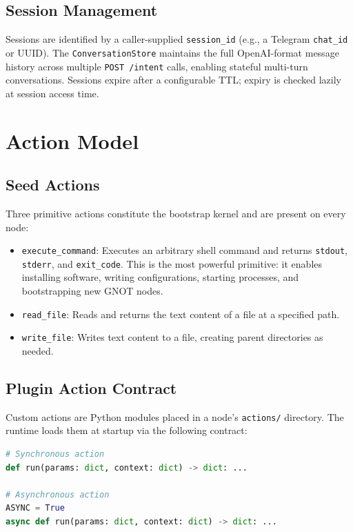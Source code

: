 \documentclass[10pt,twocolumn]{article}
\begin{document}
\subsection{Session Management}

Sessions are identified by a caller-supplied \texttt{session\_id}
(e.g., a Telegram \texttt{chat\_id} or UUID). The
\texttt{ConversationStore} maintains the full OpenAI-format message
history across multiple \texttt{POST /intent} calls, enabling stateful
multi-turn conversations. Sessions expire after a configurable TTL;
expiry is checked lazily at session access time.

\FloatBarrier
\section{Action Model}
\label{sec:actions}

\subsection{Seed Actions}

Three primitive actions constitute the bootstrap kernel and are present
on every node:

\begin{itemize}[noitemsep, leftmargin=12pt]
  \item \texttt{execute\_command}: Executes an arbitrary shell command
    and returns \texttt{stdout}, \texttt{stderr}, and \texttt{exit\_code}.
    This is the most powerful primitive: it enables installing software,
    writing configurations, starting processes, and bootstrapping new
    GNOT nodes.
  \item \texttt{read\_file}: Reads and returns the text content of a
    file at a specified path.
  \item \texttt{write\_file}: Writes text content to a file, creating
    parent directories as needed.
\end{itemize}

\subsection{Plugin Action Contract}

Custom actions are Python modules placed in a node's \texttt{actions/}
directory. The runtime loads them at startup via the following contract:

\begin{lstlisting}[language=python, caption={Plugin action contract}]
# Synchronous action
def run(params: dict, context: dict) -> dict: ...

# Asynchronous action
ASYNC = True
async def run(params: dict, context: dict) -> dict: ...
\end{lstlisting}
\end{document}
